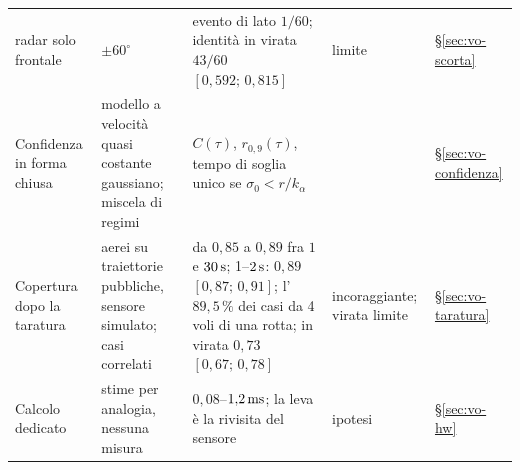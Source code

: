 \begin{table}[!htbp]
\begin{tabularx}{\textwidth}{@{}>{\RaggedRight\arraybackslash}p{3.1cm}>{\RaggedRight\arraybackslash}p{3.3cm}L>{\RaggedRight\arraybackslash}p{2.0cm}>{\RaggedRight\arraybackslash}p{1.05cm}@{}}
\quad radar solo frontale & $\pm60^\circ$ & evento di lato $1/60$; identità in virata $43/60$ $[0{,}592;\,0{,}815]$ & limite  & \S\ref{sec:vo-scorta}\\
Confidenza in forma chiusa & modello a velocità quasi costante gaussiano; miscela di regimi & $C(\tau)$, $r_{0,9}(\tau)$, tempo di soglia unico se $\sigma_0<r/k_\alpha$ &  & \S\ref{sec:vo-confidenza}\\
Copertura dopo la taratura & aerei su traiettorie pubbliche, sensore simulato; casi correlati & da $0{,}85$ a $0{,}89$ fra $1$ e $30\,\mathrm{s}$; 1--$2\,\mathrm{s}$: $0{,}89$ $[0{,}87;\,0{,}91]$; l'$89{,}5\,\%$ dei casi da 4 voli di una rotta; in virata $0{,}73$ $[0{,}67;\,0{,}78]$ & incoraggiante; virata limite  & \S\ref{sec:vo-taratura}\\
Calcolo dedicato & stime per analogia, nessuna misura & $0{,}08$--$1{,}2\,\mathrm{ms}$; la leva è la rivisita del sensore & ipotesi  & \S\ref{sec:vo-hw}\\
\bottomrule
\end{tabularx}
\end{table}

